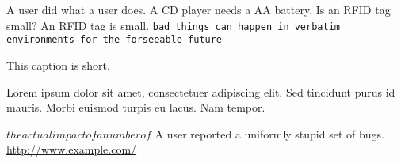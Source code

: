 \begin{comment}
some bad stuff that is in the comment environment and should be ignored.
we we
behavior
fashion
\end{comment}
A user did what a user does.  %
A CD player needs a AA battery.  %
Is an RFID tag small?
An RFID tag is small.
\verb+bad things can happen in verbatim environments for the forseeable future+
\caption{This caption is short.}
\caption[Lorem ipsum dolor sit amet.]{Lorem ipsum dolor sit amet, consectetuer adipiscing elit. Sed tincidunt purus id mauris. Morbi euismod turpis eu lacus. Nam tempor.}
$the actual impact of a number of$ %
A user reported a uniformly stupid set of bugs.
\url{http://www.example.com/}

